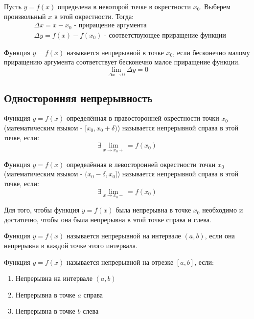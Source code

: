 Пусть $y = f(x)$ определена в некоторой точке в окрестности $x_0$.
Выберем произвольный $x$ в этой окрестности.
Тогда:
\begin{align*}
  &\boxed{\Delta x = x - x_0} \text{ - приращение аргумента} \\
  &\boxed{\Delta y = f(x) - f(x_0)} \text{ - соответствующее приращение функции}
\end{align*}


\begin{definition}
  Функция $y = f(x)$ называется непрерывной в точке $x_0$, если бесконечно малому приращению аргумента соответствует бесконечно малое приращение функции. \[
    \lim_{\Delta x \to 0} \Delta y = 0
  \] 
\end{definition}

\subsection{Односторонняя непрерывность}

\begin{definition}
  Функция $y = f(x)$ определённая в правосторонней окрестности точки $x_0$ (математическим языком - $[x_0, x_0 + \delta)$) называется непрерывной справа в этой точке, если: \[
  \exists \lim_{x \to x_0+} = f(x_0)
  \] 
\end{definition}

\begin{definition}
  Функция $y = f(x)$ определённая в левосторонней окрестности точки $x_0$ (математическим языком - $(x_0 - \delta, x_0]$) называется непрерывной справа в этой точке, если: \[
  \exists \lim_{x \to x_0-} = f(x_0)
  \] 
\end{definition}

\begin{theorem}
  Для того, чтобы функция $y = f(x)$ была непрерывна в точке $x_0$ необходимо и достаточно, чтобы она была непрерывна в этой точке справа и слева. 
\end{theorem}

\begin{definition}
  Функция $y = f(x)$ называется непрерывной на интервале $(a, b)$, если она непрерывна в каждой точке этого интервала.
\end{definition}

\begin{definition}
  Функция $y = f(x) $ называется непрерывной на отрезке $[a, b]$, если:
  \begin{enumerate}
    \item Непрерывна на интервале $(a, b)$
    \item Непрерывна в точке $a$ справа
    \item Непрерывна в точке $b$ слева
  \end{enumerate}
\end{definition}

